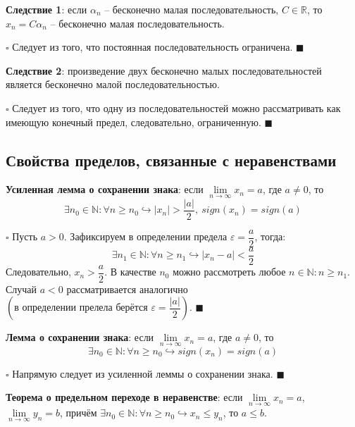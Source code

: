 \documentclass[12pt, a4paper, reqno]{article}
\begin{document}
    \textbf{Следствие 1}: если $\alpha_n$ -- бесконечно малая последовательность, $C\in\mathbb{R}$,
    то $x_n = C\alpha_n$ -- бесконечно малая последовательность.

    $\square$ Следует из того, что постоянная последовательность ограничена. $\blacksquare$

    \textbf{Следствие 2}: произведение двух бесконечно малых последовательностей является бесконечно
    малой последовательностью.

    $\square$ Следует из того, что одну из последовательностей можно рассматривать как имеющую
    конечный предел, следовательно, ограниченную. $\blacksquare$

\subsection{Свойства пределов, связанные с неравенствами}

    \textbf{Усиленная лемма о сохранении знака}: если $\lim\limits_{n\to\infty} x_n = a$, где
    $a \neq 0$, то
    \begin{equation*}
    \exists n_0\in\mathbb{N}: \forall n \geq n_0 \hookrightarrow |x_n| > \dfrac{|a|}{2},\
    sign(x_n) = sign(a)
    \end{equation*}

    $\square$ Пусть $a > 0$. Зафиксируем в определении предела $\varepsilon = \dfrac{a}{2}$, тогда:
    \begin{equation*}
        \exists n_1\in\mathbb{N}: \forall n \geq n_1 \hookrightarrow |x_n - a| < \dfrac{a}{2}
    \end{equation*}
    Следовательно, $x_n > \dfrac{a}{2}$. В качестве $n_0$ можно рассмотреть любое $n\in\mathbb{N}:
    n \geq n_1$. Случай $a < 0$ рассматривается аналогично $\left(\text{в определении прелела берётся }
    \varepsilon = \dfrac{|a|}{2}\right)$. $\blacksquare$

    \textbf{Лемма о сохранении знака}: если $\lim\limits_{n\to\infty} x_n = a$, где $a \neq 0$, то
    \begin{equation*}
        \exists n_0\in\mathbb{N}: \forall n \geq n_0 \hookrightarrow sign(x_n) = sign(a)
    \end{equation*}

    $\square$ Напрямую следует из усиленной леммы о сохранении знака. $\blacksquare$

    \textbf{Теорема о предельном переходе в неравенстве}: если $\lim\limits_{n\to\infty} x_n = a$,
    $\lim\limits_{n\to\infty} y_n = b$, причём $\exists n_0\in\mathbb{N}: \forall n \geq n_0
    \hookrightarrow x_n \leq y_n$, то $a \leq b$.
\end{document}
